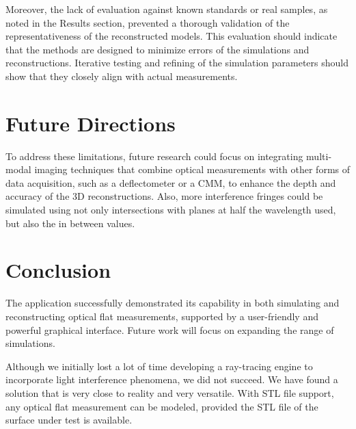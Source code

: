 \documentclass[../main.tex]{subfiles}
\begin{document}
Moreover, the lack of evaluation against known standards or real samples, as noted in the Results section, prevented a thorough validation of the representativeness of the reconstructed models. This evaluation should indicate that the methods are designed to minimize errors of the simulations and reconstructions. Iterative testing and refining of the simulation parameters should show that they closely align with actual measurements.

\section{Future Directions}
To address these limitations, future research could focus on integrating multi-modal imaging techniques that combine optical measurements with other forms of data acquisition, such as a deflectometer or a CMM, to enhance the depth and accuracy of the 3D reconstructions. Also, more interference fringes could be simulated using not only intersections with planes at half the wavelength used, but also the in between values.

\section{Conclusion}
The application successfully demonstrated its capability in both simulating and reconstructing optical flat measurements, supported by a user-friendly and powerful graphical interface. Future work will focus on expanding the range of simulations.

Although we initially lost a lot of time developing a ray-tracing engine to incorporate light interference phenomena, we did not succeed. We have found a solution that is very close to reality and very versatile. With STL file support, any optical flat measurement can be modeled, provided the STL file of the surface under test is available. 
\end{document}
